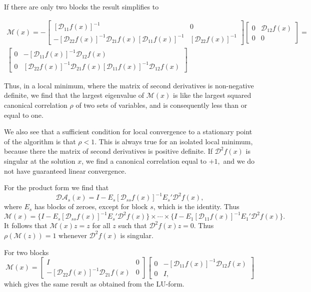 \documentclass[
  12pt,
]{book}
\begin{document}
If there are only two blocks the result simplifies to

\begin{multline*}
\mathcal{M}(x)=-
\begin{bmatrix}
[\mathcal{D}_{11}f(x)]^{-1}&0\\
 -[\mathcal{D}_{22}f(x)]^{-1}\mathcal{D}_{21}f(x)^{}[\mathcal{D}_{11}f(x)]^{-1}&
[\mathcal{D}_{22}f(x)]^{-1}
\end{bmatrix}
\begin{bmatrix}
0&\mathcal{D}_{12}f(x)\\
0&0
\end{bmatrix}=\\
\begin{bmatrix}
0&-[\mathcal{D}_{11}f(x)]^{-1}\mathcal{D}_{12}f(x)^{}\\
0&[\mathcal{D}_{22}f(x)]^{-1}\mathcal{D}_{21}f^{}(x)[\mathcal{D}_{11}f(x)]^{-1}\mathcal{D}_{12}f(x)^{}
\end{bmatrix}
\end{multline*}

Thus, in a local minimum, where the matrix of second derivatives is
non-negative definite, we find that the largest eigenvalue
of \(\mathcal{M}(x)\) is like the largest squared canonical
correlation \(\rho\) of two sets of
variables, and is consequently less than or equal to one.

We also see that a sufficient condition for local convergence
to a stationary point of the algorithm is
that \(\rho<1.\)
This is always true for an isolated local minimum, because
there the matrix of second derivatives is positive definite.
If \(\mathcal{D}^2f(x)\) is singular at the solution \(x\), we
find a canonical correlation equal to \(+1,\) and we do not have
guaranteed linear convergence.

For the product form we find that
\[
\mathcal{DA}_s(x)=I-E_s[\mathcal{D}_{ss}f(x)]^{-1}E_s'\mathcal{D}^2f(x),
\]
where \(E_s\) has blocks of zeroes, except for block \(s\), which is the identity. Thus
\[
\mathcal{M}(x)=\{I-E_s[\mathcal{D}_{ss}f(x)]^{-1}E_s'\mathcal{D}^2f(x)\}\times\cdots\times \{I-E_1[\mathcal{D}_{11}f(x)]^{-1}E_1'\mathcal{D}^2f(x)\}.
\]
It follows that \(\mathcal{M}(x)z=z\) for all \(z\) such
that \(\mathcal{D}^2f(x)z=0\). Thus \(\rho(\mathcal{M}(z))=1\)
whenever \(\mathcal{D}^2f(x)\) is singular.

For two blocks
\[
\mathcal{M}(x)=\begin{bmatrix}
I&0\\-[\mathcal{D}_{22}f(x)]^{-1}\mathcal{D}_{21}f(x)&0
\end{bmatrix}\begin{bmatrix}
0&-[\mathcal{D}_{11}f(x)]^{-1}\mathcal{D}_{12}f(x)\\0&I,
\end{bmatrix}
\]
which gives the same result as obtained from the LU-form.
\end{document}
